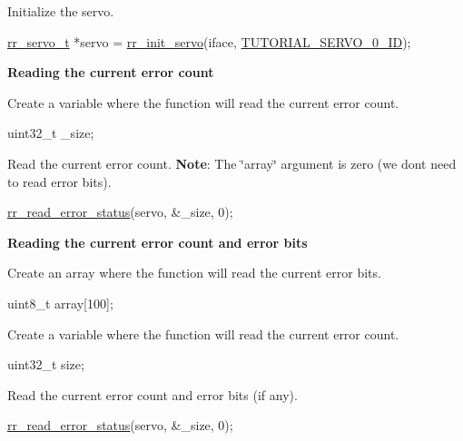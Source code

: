 \begin{DoxyEnumerate}
\item Initialize the servo. 
\begin{DoxyCodeInclude}
    \hyperlink{structrr__servo__t}{rr\_servo\_t} *servo = \hyperlink{group___init_ga0adb313a3eeb8a4399431e940a1f3e9e}{rr\_init\_servo}(iface, 
      \hyperlink{tutorial_8h_a9a3d33f25d3a72a8e30c885d238b3b65}{TUTORIAL\_SERVO\_0\_ID});
\end{DoxyCodeInclude}
 {\bfseries  Reading the current error count}
\item Create a variable where the function will read the current error count. 
\begin{DoxyCodeInclude}
    uint32\_t \_size;
\end{DoxyCodeInclude}

\item Read the current error count. {\bfseries Note}\+: The \char`\"{}array\char`\"{} argument is zero (we don\textquotesingle{}t need to read error bits). 
\begin{DoxyCodeInclude}
    \hyperlink{group___err_ga0803e0fab3e22b1bcb3f51aa393328b4}{rr\_read\_error\_status}(servo, &\_size, 0);
\end{DoxyCodeInclude}
 {\bfseries  Reading the current error count and error bits}
\item Create an array where the function will read the current error bits. 
\begin{DoxyCodeInclude}
    uint8\_t array[100];
\end{DoxyCodeInclude}

\item Create a variable where the function will read the current error count. 
\begin{DoxyCodeInclude}
    uint32\_t size;
\end{DoxyCodeInclude}

\item Read the current error count and error bits (if any). 
\begin{DoxyCodeInclude}
    \hyperlink{group___err_ga0803e0fab3e22b1bcb3f51aa393328b4}{rr\_read\_error\_status}(servo, &\_size, 0);
\end{DoxyCodeInclude}


\end{DoxyEnumerate}
